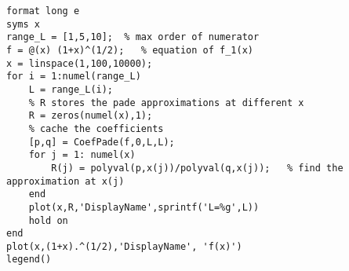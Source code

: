 \lstset{basicstyle=\footnotesize,style=myCustomMatlabStyle}
\begin{lstlisting}
format long e
syms x
range_L = [1,5,10];  % max order of numerator
f = @(x) (1+x)^(1/2);   % equation of f_1(x)
x = linspace(1,100,10000);
for i = 1:numel(range_L)
    L = range_L(i);
    % R stores the pade approximations at different x
    R = zeros(numel(x),1);
    % cache the coefficients
    [p,q] = CoefPade(f,0,L,L);
    for j = 1: numel(x)
        R(j) = polyval(p,x(j))/polyval(q,x(j));   % find the approximation at x(j)
    end
    plot(x,R,'DisplayName',sprintf('L=%g',L))
    hold on
end
plot(x,(1+x).^(1/2),'DisplayName', 'f(x)')
legend()

\end{lstlisting}